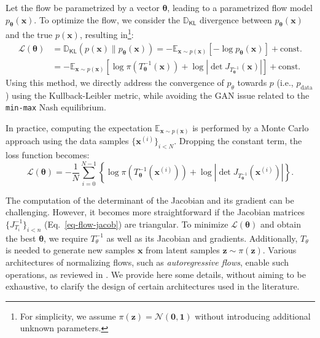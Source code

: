 \documentclass[fleqn,usenatbib]{mnras}
\newcommand{\Esp}[0]{\ensuremath{\mathbb{E}}}
\newcommand{\DKL}[0]{\ensuremath{\mathbb{D}_{\mathsf{KL}}}}
\newcommand{\nn}{\nonumber}
\begin{document}
Let the flow be parametrized by a vector $\bm{\theta}$, leading to a parametrized flow model $p_{\bm{\theta}}(\bm{x})$. To optimize the flow, we consider the $\DKL$ divergence between $p_{\bm{\theta}}(\bm{x})$ and the true $p(\bm{x})$, resulting in\footnote{For simplicity, we assume $\pi(\bm{z}) = \mathcal{N}(\bm{0}, \bm{1})$ without introducing additional unknown parameters.}:
\begin{align}
\mathcal{L}(\bm{\theta}) &= \DKL(p(\bm{x})\|p_{\bm{\theta}}(\bm{x})) 
= - \Esp_{\bm{x}\sim p(\bm{x})}[-\log p_{\bm{\theta}}(\bm{x})] + \mathrm{const.} \nn \\
&= - \Esp_{\bm{x}\sim p(\bm{x})}[\log \pi(T_{\bm{\theta}}^{-1}(\bm{x})) + \log |\det J_{T_{\bm{\theta}}^{-1}}(\bm{x})|] + \mathrm{const.}
\label{eq-NF-loss-1}
\end{align}
{\color{red} Using this method, we directly address the convergence of $p_\theta$ towards $p$ (i.e., $p_{\text{data}}$) using the Kullback-Leibler metric, while avoiding the GAN issue related to the \texttt{min-max} Nash equilibrium.}

{\color{red} In practice, computing the expectation $\Esp_{\bm{x} \sim p(\bm{x})}$ 
is performed by a Monte Carlo approach using the data samples $\{\bm{x}^{(i)}\}_{i<N}$.} 
Dropping the constant term, the loss function becomes:
\begin{equation}
\mathcal{L}(\bm{\theta}) = -\frac{1}{N} \sum_{i=0}^{N-1} \left\{ \log \pi(T_{\bm{\theta}}^{-1}(\bm{x}^{(i)})) + \log |\det J_{T_{\bm{\theta}}^{-1}}(\bm{x}^{(i)})| \right\}.
\label{eq-NF-loss-2}
\end{equation}

The computation of the determinant of the Jacobian and its gradient can be challenging. However, it becomes more straightforward if the Jacobian matrices $\{J_{T_i}^{-1}\}_{i<n}$ (Eq.~\ref{eq-flow-jacob}) are triangular. To minimize $\mathcal{L}(\bm{\theta})$ and obtain the best $\bm{\theta}$, we require $T_\theta^{-1}$ as well as its Jacobian and gradients. Additionally, $T_\theta$ is needed to generate new samples $\bm{x}$ from latent samples $\bm{z} \sim \pi(\bm{z})$. Various architectures of normalizing flows, such as \textit{autoregressive flows}, enable such operations, as reviewed in \cite{Papamakarios2021}. {\color{red} We provide here some details, without aiming to be exhaustive, to clarify the design of certain architectures used in the literature.
}
\end{document}
